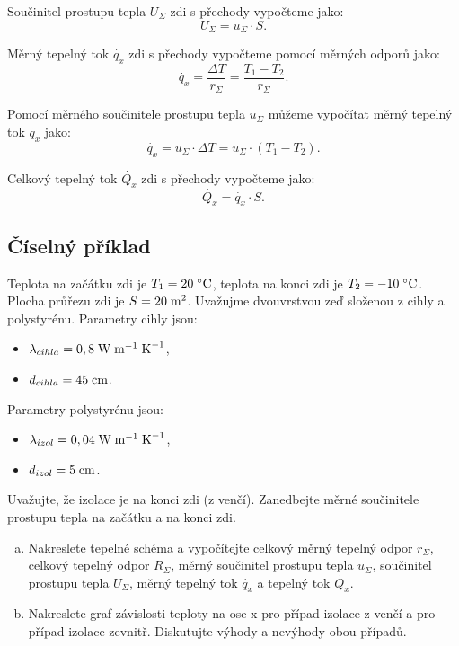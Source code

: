 \documentclass{article}
\begin{document}
Součinitel prostupu tepla $U_{\Sigma}$ zdi s přechody vypočteme jako:
$$
    U_{\Sigma} = u_{\Sigma} \cdot S.
$$

Měrný tepelný tok $\dot{q_x}$ zdi s přechody vypočteme pomocí měrných odporů jako:
$$
    \dot{q_x} = \frac{\Delta T}{r_{\Sigma}} = \frac{T_1 - T_2}{r_{\Sigma}}.
$$

Pomocí měrného součinitele prostupu tepla $u_{\Sigma}$ můžeme vypočítat měrný tepelný tok $\dot{q_x}$ jako:
$$
    \dot{q_x} = u_{\Sigma} \cdot \Delta T = u_{\Sigma} \cdot (T_1 - T_2).
$$

Celkový tepelný tok $\dot{Q_x}$ zdi s přechody vypočteme jako:
$$
    \dot{Q_x} = \dot{q_x} \cdot S.
$$


\subsection{Číselný příklad}
Teplota na začátku zdi je $T_1 = 20 \; ^\circ \textrm{C}$, teplota na konci zdi je $T_2 = -10 \; ^\circ \textrm{C}$. Plocha průřezu zdi je $S = 20 \; \textrm{m}^{\textrm{2}}$. Uvažujme dvouvrstvou zeď složenou z cihly a polystyrénu. Parametry cihly jsou:
\begin{itemize}
    \item $\lambda_{cihla} = 0,8 \; \textrm{W} \; \textrm{m}^{-1} \; \textrm{K}^{-1}$,
    \item $d_{cihla} = 45 \; \textrm{cm}$.
\end{itemize}

Parametry polystyrénu jsou:
\begin{itemize}
    \item $\lambda_{izol} = 0,04 \; \textrm{W} \; \textrm{m}^{-1} \; \textrm{K}^{-1}$,
    \item $d_{izol} = 5 \; \textrm{cm}$.
\end{itemize}

Uvažujte, že izolace je na konci zdi (z venčí). Zanedbejte měrné součinitele prostupu tepla na začátku a na konci zdi.

\begin{enumerate}[a)]
    \item Nakreslete tepelné schéma a vypočítejte celkový měrný tepelný odpor $r_{\Sigma}$, celkový tepelný odpor $R_{\Sigma}$, měrný součinitel prostupu tepla $u_{\Sigma}$, součinitel prostupu tepla $U_{\Sigma}$, měrný tepelný tok $\dot{q_x}$ a tepelný tok $\dot{Q_x}$.
    \item Nakreslete graf závislosti teploty na ose x pro případ izolace z venčí a pro případ izolace zevnitř. Diskutujte výhody a nevýhody obou případů.
\end{enumerate}
\end{document}
